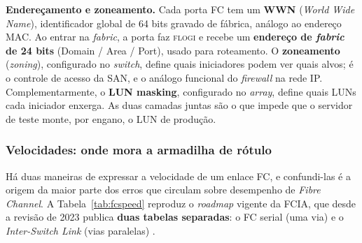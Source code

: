 \documentclass[11pt,a4paper]{article}
\begin{document}
\textbf{Endereçamento e zoneamento.} Cada porta FC tem um \textbf{WWN} (\textit{World Wide Name}),
identificador global de 64 bits gravado de fábrica, análogo ao endereço MAC. Ao entrar na
\textit{fabric}, a porta faz \textsc{flogi} e recebe um \textbf{endereço de \textit{fabric} de 24
bits} (Domain / Area / Port), usado para roteamento. O \textbf{zoneamento} (\textit{zoning}),
configurado no \textit{switch}, define quais iniciadores podem ver quais alvos; é o controle de
acesso da SAN, e o análogo funcional do \textit{firewall} na rede IP. Complementarmente, o
\textbf{LUN masking}, configurado no \textit{array}, define quais LUNs cada iniciador enxerga. As
duas camadas juntas são o que impede que o servidor de teste monte, por engano, o LUN de produção.

\subsubsection*{Velocidades: onde mora a armadilha de rótulo}

Há duas maneiras de expressar a velocidade de um enlace FC, e confundi-las é a origem da maior
parte dos erros que circulam sobre desempenho de \textit{Fibre Channel}. A
Tabela~\ref{tab:fcspeed} reproduz o \textit{roadmap} vigente da FCIA, que desde a revisão de 2023
publica \textbf{duas tabelas separadas}: o FC serial (uma via) e o \textit{Inter-Switch Link}
(vias paralelas) \cite{fciaroadmap}.
\end{document}

